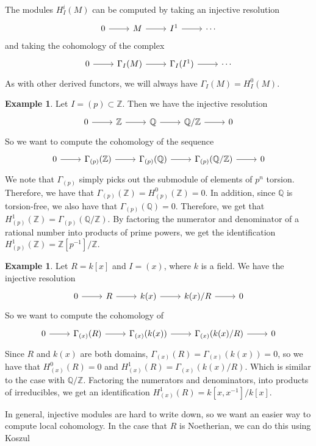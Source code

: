 \documentclass[psamsfonts, 12pt]{amsart}
\theoremstyle{definition}
\newtheorem{exmp}[thm]{Example}
\theoremstyle{remark}
\newcommand{\Q}{\mathbb{Q}}
\newcommand{\Z}{\mathbb{Z}}
\newcommand{\inv}{^{-1}}
\begin{document}
The modules $H^i_I(M)$ can be computed by taking an injective resolution
\[\begin{tikzcd}
0 \ar[r] & M \ar[r] & I^1 \ar[r] & \cdots
\end{tikzcd}\]
and taking the cohomology of the complex
\[\begin{tikzcd}
0 \ar[r] & \Gamma_I(M) \ar[r] & \Gamma_I(I^1) \ar[r] & \cdots
\end{tikzcd}\]
%
As with other derived functors, we will always have $\Gamma_I(M) = H^0_I(M)$.
%
\begin{exmp}
Let $I = (p) \subset \Z$. Then we have the injective resolution
\[\begin{tikzcd}
0 \ar[r] & \Z \ar[r] & \Q \ar[r] & \Q/\Z \ar[r] & 0
\end{tikzcd}\]
So we want to compute the cohomology of the sequence
\[\begin{tikzcd}
0 \ar[r] & \Gamma_{(p)}(\Z) \ar[r] & \Gamma_{(p)}(\Q) \ar[r] & \Gamma_{(p)}(\Q/\Z)
\ar[r] & 0
\end{tikzcd}\]
We note that $\Gamma_(p)$ simply picks out the submodule of elements of $p^n$ torsion.
Therefore, we have that $\Gamma_{(p)}(\Z) = H^0_{(p)}(\Z) = 0$. In addition, since
$\Q$ is torsion-free, we also have that $\Gamma_{(p)}(\Q) = 0$. Therefore, we
get that $H^1_{(p)}(\Z) = \Gamma_{(p)}(\Q/\Z)$. By factoring the numerator and
denominator of a rational number into products of prime powers, we get the identification
$H^1_{(p)}(\Z) = \Z[p\inv]/\Z$.
\end{exmp}
%
\begin{exmp}
Let $R = k[x]$ and $I = (x)$, where $k$ is a field. We have the injective resolution
\[\begin{tikzcd}
0 \ar[r] & R \ar[r] & k(x) \ar[r] & k(x)/R \ar[r] & 0
\end{tikzcd}\]
So we want to compute the cohomology of
\[\begin{tikzcd}
0 \ar[r] & \Gamma_{(x)}(R) \ar[r] & \Gamma_{(x)}(k(x)) \ar[r] & \Gamma_{(x)}(k(x)/R)
\ar[r] & 0
\end{tikzcd}\]
Since $R$ and $k(x)$ are both domains, $\Gamma_{(x)}(R) = \Gamma_{(x)}(k(x)) = 0$,
so we have that $H^0_{(x)}(R) = 0$ and $H^1_{(x)}(R) = \Gamma_{(x)}(k(x)/R)$.
Which is similar to the case with $\Q/\Z$. Factoring the numerators and denominators,
into products of irreducibles, we get an identification $H^1_{(x)}(R) = k[x,x\inv]/k[x]$.
\end{exmp}
%
In general, injective modules are hard to write down, so we want an easier way to compute
local cohomology. In the case that $R$ is Noetherian, we can do this using Koszul
\end{document}

